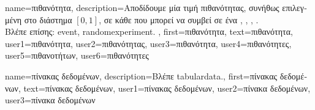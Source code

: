 {name={\foreignlanguage{greek}{πιθανότητα}},
	description={\foreignlanguage{greek}{Αποδίδουμε} \foreignlanguage{greek}{μία τιμή 
		πιθανότητας, συνήθως επιλεγμένη στο διάστημα $[0,1]$, σε κάθε}  
		\foreignlanguage{greek}{που μπορεί να συμβεί σε ένα}  
		\cite{BillingsleyProbMeasure}, \cite{BertsekasProb}, \cite{KallenbergBook}, \cite{HalmosMeasure}. 
		\\
		\foreignlanguage{greek}{Βλέπε επίσης:} \gls{event}, \gls{randomexperiment}. },
	first={\foreignlanguage{greek}{πιθανότητα}},
	text={\foreignlanguage{greek}{πιθανότητα}},
	user1={\foreignlanguage{greek}{πιθανότητα}}, %
    	user2={\foreignlanguage{greek}{πιθανότητας}}, %
	user3={\foreignlanguage{greek}{πιθανότητα}}, %
	user4={\foreignlanguage{greek}{πιθανότητες}}, %
    	user5={\foreignlanguage{greek}{πιθανοτήτων}}, %
	user6={\foreignlanguage{greek}{πιθανότητες}} %
}

{name={\foreignlanguage{greek}{πίνακας δεδομένων}},
	description={\foreignlanguage{greek}{Βλέπε} \gls{tabulardata}.}, 
	first={\foreignlanguage{greek}{πίνακας δεδομένων}},
	text={\foreignlanguage{greek}{πίνακας δεδομένων}},
	user1={\foreignlanguage{greek}{πίνακας δεδομένων}}, %
	user2={\foreignlanguage{greek}{πίνακα δεδομένων}}, %
	user3={\foreignlanguage{greek}{πίνακα δεδομένων}} %
}

